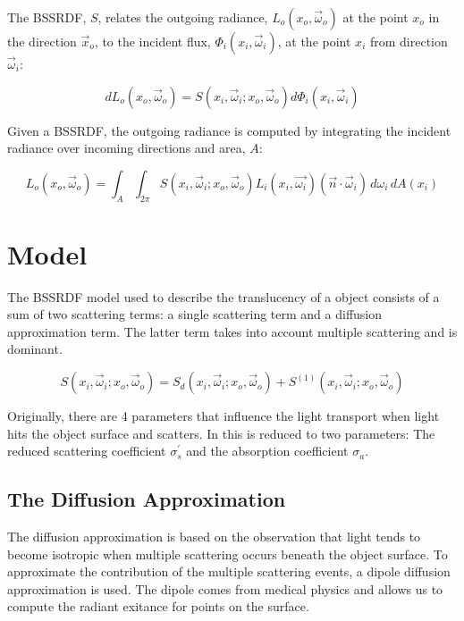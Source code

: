\documentclass{article}
\begin{document}
The BSSRDF, $S$, relates the outgoing radiance, $L _o(x _o, \vec{\omega} _o)$ at the point $x _o$ in the direction $\vec{x} _o$, to the incident flux, $\Phi _i(x _i, \vec{\omega} _i)$, at the point $x _i$ from direction $\vec{\omega} _i$:

\begin{equation}
dL _o(x _o, \vec{\omega} _o) = S(x _i, \vec{\omega} _i; x _o, \vec{\omega} _o) d\Phi _i(x _i, \vec{\omega} _i)
\end{equation}

Given a BSSRDF, the outgoing radiance is computed by integrating the incident radiance over incoming directions and area, $A$:

\begin{equation}
L _o(x _o, \vec{\omega} _o) = 
\int_{A}\int _{2\pi} S(x _i, \vec{\omega} _i; x _o, \vec{\omega} _o) L_i(x_i, \vec{\omega_i})(\vec{n} \cdotp \vec{\omega}_i) \,d\omega_i \,dA(x_i)
\end{equation}

\section{Model}
The BSSRDF model used to describe the translucency of a object consists of a sum of two scattering terms: a single scattering term and a diffusion approximation term.\cite{PracticalSSS} The latter term takes into account multiple scattering and is dominant.

\begin{equation}
S(x _i, \vec{\omega} _i; x _o, \vec{\omega} _o) =  {S}_{d}(x _i, \vec{\omega} _i; x _o, \vec{\omega} _o) + {S}^{(1)}(x _i, \vec{\omega} _i; x _o, \vec{\omega} _o)
\end{equation}

Originally, there are 4 parameters that influence the light transport when light hits the object surface and scatters. In \cite{HierarchicalSSS} this is reduced to two parameters: The reduced scattering coefficient ${\sigma}^{\prime}_s$ and the absorption coefficient $\sigma_{ a }$. 


\subsection{The Diffusion Approximation}
The diffusion approximation is based on the observation that light tends to become isotropic when multiple scattering occurs beneath the object surface. To approximate the contribution of the multiple scattering events, a dipole diffusion approximation is used. The dipole comes from medical physics and allows us to compute the radiant exitance for points on the surface.
\end{document}
